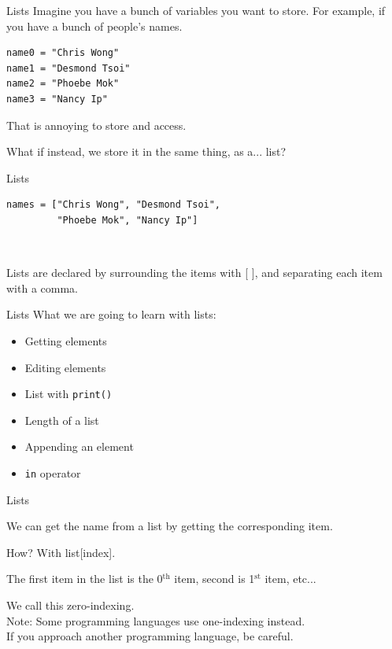 \documentclass[dvipsnames, svgnames, x11names]{beamer}
\begin{document}
\begin{frame}[fragile]{Lists}
Imagine you have a bunch of variables you want to store.
For example, if you have a bunch of people's names.
\begin{verbatim}
name0 = "Chris Wong"
name1 = "Desmond Tsoi"
name2 = "Phoebe Mok"
name3 = "Nancy Ip"
\end{verbatim}
That is annoying to store and access.

\pause What if instead, we store it in the same thing, as a... \pause list?
\end{frame}

\begin{frame}[fragile]{Lists}
\begin{verbatim}
names = ["Chris Wong", "Desmond Tsoi",
         "Phoebe Mok", "Nancy Ip"]
\end{verbatim}

\

Lists are declared by surrounding the items with [ ], and separating each item with a comma.

\end{frame}

\begin{frame}[fragile]{Lists}
What we are going to learn with lists:

\begin{itemize}
    \item Getting elements
    \item Editing elements
    \item List with \texttt{print()}
    \item Length of a list
    \item Appending an element
    \item \texttt{in} operator
\end{itemize}
\end{frame}

\begin{frame}[fragile]{Lists}

We can get the name from a list by getting the corresponding item.

How? With list[index].

The first item in the list is the 0$^{\text{th}}$ item, second is 1$^{\text{st}}$ item, etc... 

We call this zero-indexing.\\

{\tiny Note: Some programming languages use one-indexing instead.\\[-1em]

\hspace{2.5em} If you approach another programming language, be careful.}
\end{frame}
\end{document}
